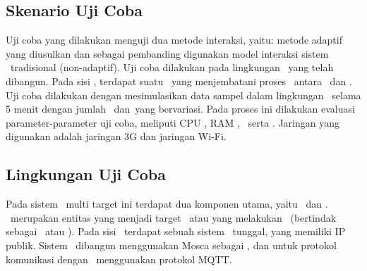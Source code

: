 \subsection{Skenario Uji Coba}

Uji coba yang dilakukan menguji dua metode interaksi, yaitu: metode adaptif yang
diusulkan dan sebagai pembanding digunakan model interaksi sistem
\pubsub~tradisional (non-adaptif). Uji coba dilakukan pada lingkungan
\testbed~yang telah dibangun. Pada sisi \server, terdapat suatu \broker~yang
menjembatani proses \tracking~antara \publisher~dan \subscriber. Uji coba
dilakukan dengan mesimulasikan data sampel dalam lingkungan \testbed~selama 5
menit dengan jumlah \publisher~dan~\subscriber yang bervariasi. Pada proses ini
dilakukan evaluasi parameter-parameter uji coba, meliputi CPU \server, RAM
\server, \bandwidth~serta \latency. Jaringan yang digunakan adalah jaringan 3G
dan jaringan Wi-Fi.


\subsection{Lingkungan Uji Coba}

Pada sistem \tracking~multi target ini terdapat dua komponen utama,
yaitu \client~dan \server. \Client~merupakan entitas yang menjadi target
\tracking~atau yang melakukan \tracking~(bertindak sebagai \publisher~atau
\subscriber). Pada sisi \server~terdapat sebuah sistem \pubsub~tunggal, yang
memiliki IP publik. Sistem \pubsub~dibangun menggunakan Mosca sebagai
\broker, dan untuk protokol komunikasi dengan \client~menggunakan protokol
MQTT\@.

